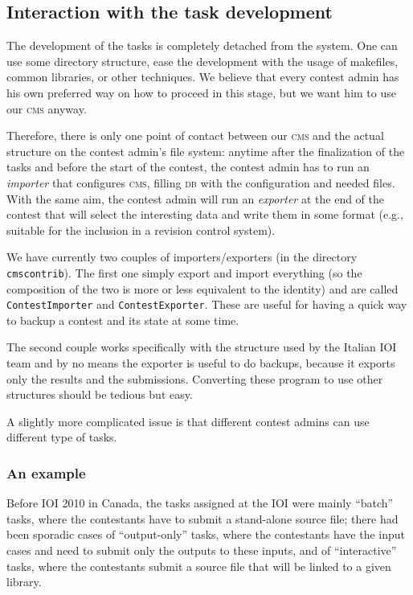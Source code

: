\documentclass[a4paper,8pt]{amsart}
\newcommand{\CMS}{\textsc{cms}}
\newcommand{\DB}{\textsc{db}}
\newcommand{\file}[1]{\texttt{#1}}
\begin{document}
\begin{multicols}{2}
  \subsection{Interaction with the task development}

  The development of the tasks is completely detached from the
  system. One can use some directory structure, ease the development
  with the usage of makefiles, common libraries, or other
  techniques. We believe that every contest admin has his own
  preferred way on how to proceed in this stage, but we want him to
  use our \CMS{} anyway.

  Therefore, there is only one point of contact between our \CMS{} and
  the actual structure on the contest admin's file system: anytime
  after the finalization of the tasks and before the start of the
  contest, the contest admin has to run an \emph{importer\/} that
  configures \CMS{}, filling \DB{} with the configuration and needed
  files. With the same aim, the contest admin will run an
  \emph{exporter\/} at the end of the contest that will select the
  interesting data and write them in some format (e.g., suitable for
  the inclusion in a revision control system).

  We have currently two couples of importers/exporters (in the
  directory \file{cmscontrib}). The first one simply export and import
  everything (so the composition of the two is more or less equivalent
  to the identity) and are called \file{ContestImporter} and
  \file{ContestExporter}. These are useful for having a quick way to
  backup a contest and its state at some time.

  The second couple works specifically with the structure used by the
  Italian IOI team and by no means the exporter is useful to do
  backups, because it exports only the results and the submissions.
  Converting these program to use other structures should be tedious
  but easy.

  A slightly more complicated issue is that different contest admins
  can use different type of tasks.

  \subsubsection{An example}

  Before IOI 2010 in Canada, the tasks assigned at the IOI were mainly
  ``batch'' tasks, where the contestants have to submit a stand-alone
  source file; there had been sporadic cases of ``output-only'' tasks,
  where the contestants have the input cases and need to submit only
  the outputs to these inputs, and of ``interactive'' tasks, where the
  contestants submit a source file that will be linked to a given
  library.


\end{multicols}
\end{document}
